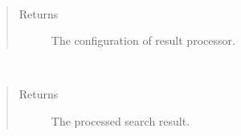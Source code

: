 \documentclass[letterpaper,10pt,english]{sphinxmanual}
\begin{document}
\begin{fulllineitems}
\begin{fulllineitems}
\end{fulllineitems}


\begin{fulllineitems}
\label{docs/api:ResultProcessor::getConfiguration}~\begin{quote}\begin{description}
\item[{Returns}] \leavevmode
The configuration of result processor.

\end{description}\end{quote}

\end{fulllineitems}


\begin{fulllineitems}
\label{docs/api:ResultProcessor::process}~\begin{quote}\begin{description}
\item[{Returns}] \leavevmode
The processed search result.

\end{description}\end{quote}

\end{fulllineitems}


\end{fulllineitems}

\end{document}
